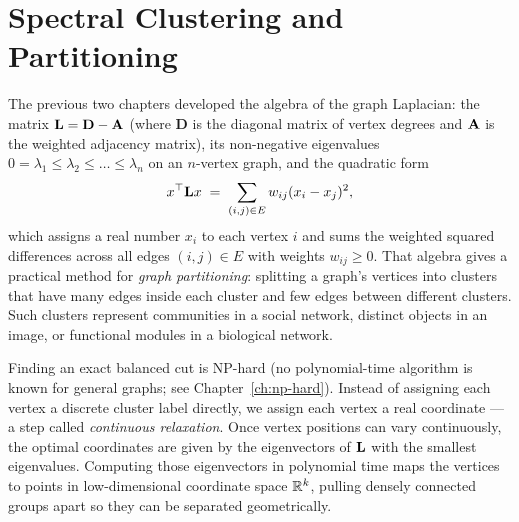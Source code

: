 \chapter{Spectral Clustering and Partitioning}

\chapterline

\providecommand{\cut}{\operatorname{cut}}
\providecommand{\vol}{\operatorname{vol}}
\providecommand{\diag}{\operatorname{diag}}
\providecommand{\RatioCut}{\operatorname{RatioCut}}
\providecommand{\NCut}{\operatorname{NCut}}

The previous two chapters developed the algebra of the graph Laplacian: the matrix
$\mathbf{L} = \mathbf{D} - \mathbf{A}$ (where $\mathbf{D}$ is the diagonal matrix of vertex degrees and $\mathbf{A}$ is the weighted adjacency matrix), its non-negative eigenvalues $0 = \lambda_1 \le \lambda_2 \le \dots \le \lambda_n$ on an $n$-vertex graph,
and the quadratic form
\[
  x^\top \mathbf{L} x \;=\; \sum_{(i,j)\in E} w_{ij}(x_i - x_j)^2,
\]
which assigns a real number $x_i$ to each vertex $i$ and sums the weighted squared differences across all edges $(i,j)\in E$ with weights $w_{ij} \ge 0$. That algebra gives a practical method for \emph{graph partitioning}: splitting a graph's vertices into clusters that have many edges inside each cluster and few edges between different clusters. Such clusters represent communities in a social network, distinct objects in an image, or functional modules in a biological network.

Finding an exact balanced cut is NP-hard (no polynomial-time algorithm is known for general graphs; see Chapter~\ref{ch:np-hard}).
Instead of assigning each vertex a discrete cluster label directly, we assign each vertex a real coordinate --- a step called \emph{continuous relaxation}. Once vertex positions can vary continuously, the optimal coordinates are given by the eigenvectors of $\mathbf{L}$ with the smallest eigenvalues. Computing those eigenvectors in polynomial time maps the vertices to points in low-dimensional coordinate space $\mathbb{R}^k$, pulling densely connected groups apart so they can be separated geometrically.

